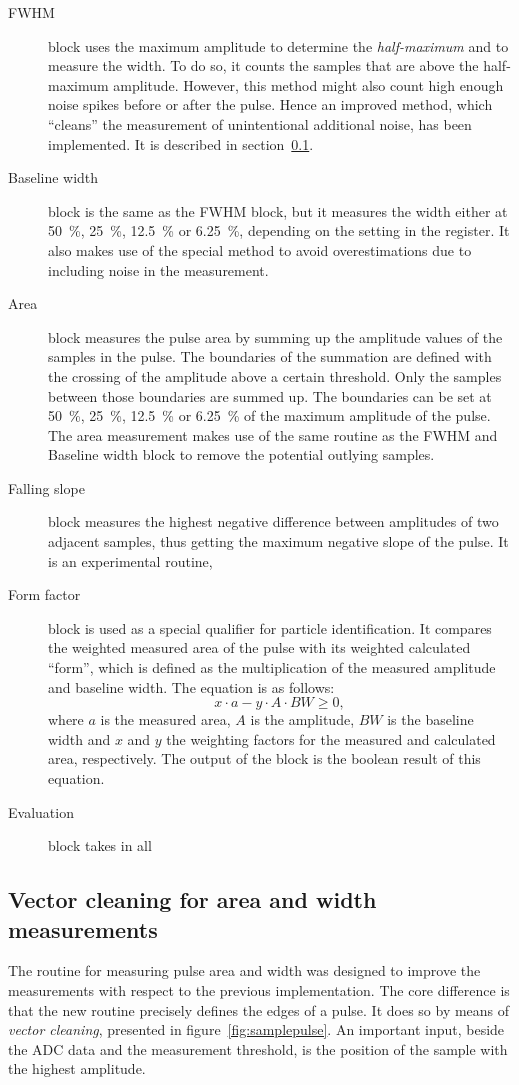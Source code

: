 \documentclass[12pt]{mytustyle}  %
\begin{document}
\begin{description}
\item[FWHM] block uses the maximum amplitude to determine the \emph{half-maximum} and to measure the width. To do so, it counts the samples that are above the half-maximum amplitude. However, this method might also count high enough noise spikes before or after the pulse. Hence an improved method, which ``cleans'' the measurement of unintentional additional noise, has been implemented. It is described in section~\ref{sec:vecclean}.
\item[Baseline width] block is the same as the FWHM block, but it measures the width either at 50~\%, 25~\%, 12.5~\% or 6.25~\%, depending on the setting in the register. It also makes use of the special method to avoid overestimations due to including noise in the measurement.
\item[Area] block measures the pulse area by summing up the amplitude values of the samples in the pulse. The boundaries of the summation are defined with the crossing of the amplitude above a certain threshold. Only the samples between those boundaries are summed up. The boundaries can be set at  50~\%, 25~\%, 12.5~\% or 6.25~\% of the maximum amplitude of the pulse. The area measurement makes use of the same routine as the FWHM and Baseline width block to remove the potential outlying samples.

\item[Falling slope] block measures the highest negative difference between amplitudes of two adjacent samples, thus getting the maximum negative slope of the pulse. It is an experimental routine,
\item[Form factor] block is used as a special qualifier for particle identification. It compares the weighted measured area of the pulse with its weighted calculated ``form'', which is defined as the multiplication of the measured amplitude and baseline width. The equation is as follows:
\begin{equation}
\label{eq:formfactor1}
x\cdot a - y \cdot A \cdot BW \geq 0,
\end{equation}
where $a$ is the measured area, $A$ is the amplitude, $BW$ is the baseline width and $x$ and $y$ the weighting factors for the measured and calculated area, respectively. The output of the block is the boolean result of this equation.
\item[Evaluation] block takes in all 

\end{description}


\subsection{Vector cleaning for area and width measurements}
\label{sec:vecclean}
The routine for measuring pulse area and width was designed to improve the measurements with respect to the previous implementation. The core difference is that the new routine precisely defines the edges of a pulse. It does so by means of \emph{vector cleaning}, presented in figure~\ref{fig:samplepulse}. An important input, beside the ADC data and the measurement threshold, is the position of the sample with the highest amplitude. 
\end{document}
